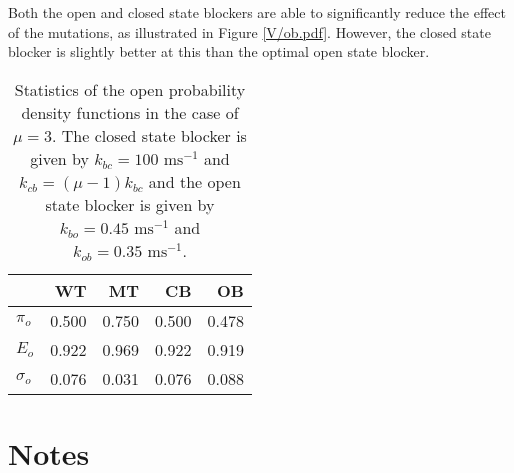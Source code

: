 Both the open and closed state blockers are able to significantly reduce the effect of the mutations, as illustrated in
Figure \ref{V/ob.pdf}. However, the closed state blocker is slightly better at this than the optimal open state blocker.

\begin{table}  \begin{center}
\begin{tabular}{|l|r|r|r|r|} \hline
&WT & MT & CB & OB \\ \hline
$\pi_o$ &0.500 & 0.750 & 0.500 & 0.478 \\ \hline
$E_o$   &0.922 & 0.969 & 0.922 & 0.919 \\ \hline
$\sigma_o$ & 0.076 & 0.031 & 0.076 & 0.088 \\ \hline
\end{tabular} \end{center}
\caption{Statistics of the open probability density functions in the case of $\mu=3$. The closed state blocker is given by
$k_{bc}=100\text{ ms}^{-1}$ and $k_{cb}=\left(  \mu-1\right)  k_{bc}$ and the open state blocker is given by $k_{bo}=0.45\text{ ms}^{-1}$ and $k_{ob}=0.35\text{ ms}^{-1}$.  \label{Vstat}}
\end{table}




\section{Notes}

